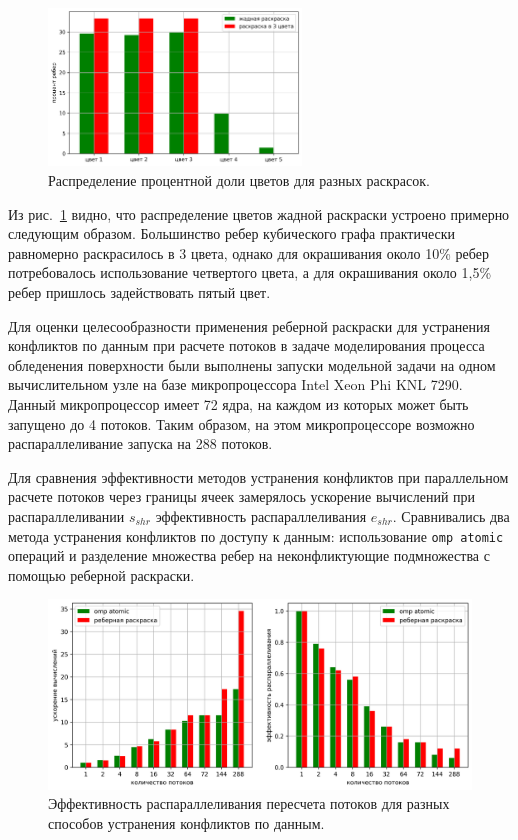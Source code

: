 \begin{figure}[ht]
\centering
\includegraphics[width=0.6\textwidth]{fig/par_edge_col_10-chart.png}
\singlespacing
{}\caption{Распределение процентной доли цветов для разных раскрасок.}
\label{fig:text_3_edge_coloring_10}
\end{figure}

Из рис.~\ref{fig:text_3_edge_coloring_10} видно, что распределение цветов жадной раскраски устроено примерно следующим образом.
Большинство ребер кубического графа практически равномерно раскрасилось в 3 цвета, однако для окрашивания около 10\% ребер потребовалось использование четвертого цвета, а для окрашивания около 1,5\% ребер пришлось задействовать пятый цвет.

Для оценки целесообразности применения реберной раскраски для устранения конфликтов по данным при расчете потоков в задаче моделирования процесса обледенения поверхности были выполнены запуски модельной задачи на одном вычислительном узле на базе микропроцессора Intel Xeon Phi KNL 7290.
Данный микропроцессор имеет 72 ядра, на каждом из которых может быть запущено до 4 потоков.
Таким образом, на этом микропроцессоре возможно распараллеливание запуска на 288 потоков.

Для сравнения эффективности методов устранения конфликтов при параллельном расчете потоков через границы ячеек замерялось ускорение вычислений при распараллеливании $s_{shr}$ эффективность распараллеливания $e_{shr}$.
Сравнивались два метода устранения конфликтов по доступу к данным: использование \texttt{omp atomic} операций и разделение множества ребер на неконфликтующие подмножества с помощью реберной раскраски.

\begin{figure}[ht]
\centering
\includegraphics[width=1.0\textwidth]{fig/par_edge_col_11-chart.png}
\singlespacing
{}\caption{Эффективность распараллеливания пересчета потоков для разных способов устранения конфликтов по данным.}
\label{fig:text_3_edge_coloring_11}
\end{figure}

